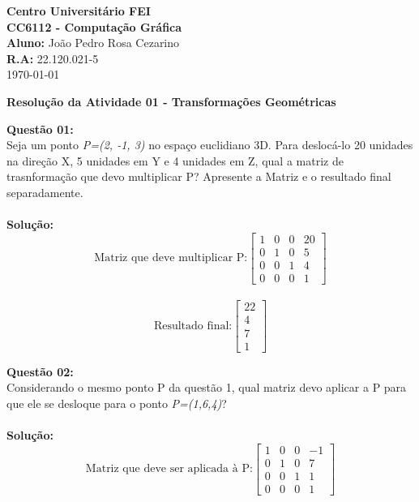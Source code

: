 \documentclass[10pt]{article}
\begin{document}
\noindent \textbf{Centro Universitário FEI}\\
\noindent \textbf{CC6112 - Computação Gráfica}\\
\noindent \textbf{Aluno: } João Pedro Rosa Cezarino  \\ 
\noindent \textbf{R.A: } 22.120.021-5\\
\today
\\
\begin{center}
    \noindent \textbf{Resolução da Atividade 01 - Transformações Geométricas}
\end{center}
\vspace{0.5cm}
\noindent\textbf{Questão 01:}\\
Seja um ponto \emph{P=(2, -1, 3)} no espaço euclidiano 3D. Para deslocá-lo 20 unidades na direção X, 5 unidades em Y e 4 unidades em Z, qual a matriz de trasnformação que devo multiplicar P? Apresente a Matriz e o resultado final separadamente.\\
\\
\noindent\textbf{Solução:}
\[
\text{Matriz que deve multiplicar P:}
	\begin{bmatrix}
        1 & 0 & 0 & 20\\
        0 & 1 & 0 & 5\\
        0 & 0 & 1 & 4\\
        0 & 0 & 0 & 1
    \end{bmatrix}
\]
\\
\[  
\text{Resultado final:}
	\begin{bmatrix}
        22\\
        4\\
        7\\
        1
    \end{bmatrix}
\]


\vspace{1 cm}
\noindent\textbf{Questão 02:}\\
Considerando o mesmo ponto P da questão 1, qual matriz devo aplicar a P para que ele se desloque para o ponto \emph{P=(1,6,4)}?\\
\\
\noindent\textbf{Solução:}
\[
\text{Matriz que deve ser aplicada à P:}
	\begin{bmatrix}
        1 & 0 & 0 & -1\\
        0 & 1 & 0 & 7\\
        0 & 0 & 1 & 1\\
        0 & 0 & 0 & 1
    \end{bmatrix}
\]
\end{document}

